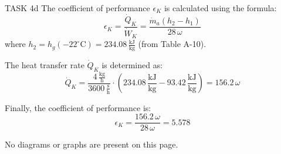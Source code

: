 TASK 4d  
The coefficient of performance \( \epsilon_K \) is calculated using the formula:  
\[
\epsilon_K = \frac{\dot{Q}_K}{\dot{W}_K} = \frac{\dot{m}_a (h_2 - h_1)}{28 \, \omega}
\]  
where \( h_2 = h_g(-22^\circ\text{C}) = 234.08 \, \frac{\text{kJ}}{\text{kg}} \) (from Table A-10).  

The heat transfer rate \( \dot{Q}_K \) is determined as:  
\[
\dot{Q}_K = \frac{4 \, \frac{\text{kg}}{\text{h}}}{3600 \, \frac{\text{s}}{\text{h}}} \cdot \left( 234.08 \, \frac{\text{kJ}}{\text{kg}} - 93.42 \, \frac{\text{kJ}}{\text{kg}} \right) = 156.2 \, \omega
\]  

Finally, the coefficient of performance is:  
\[
\epsilon_K = \frac{156.2 \, \omega}{28 \, \omega} = 5.578
\]  

No diagrams or graphs are present on this page.